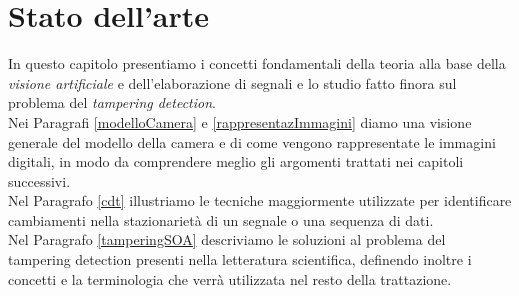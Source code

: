 \chapter{Stato dell'arte}
\label{StatoArte}
\thispagestyle{empty}

\vspace{0.5cm}

\noindent In questo capitolo presentiamo i concetti fondamentali della teoria alla base della \textit{visione artificiale} e dell'elaborazione di segnali e lo studio fatto finora sul problema del \textit{tampering detection}.\\
Nei Paragrafi \ref{modelloCamera} e \ref{rappresentazImmagini} diamo una visione generale del modello della camera e di come vengono rappresentate le immagini digitali, in modo da comprendere meglio gli argomenti trattati nei capitoli successivi.\\
Nel Paragrafo \ref{cdt} illustriamo le tecniche maggiormente utilizzate per identificare cambiamenti nella stazionariet\`a di un segnale o una sequenza di dati.\\
Nel Paragrafo \ref{tamperingSOA} descriviamo le soluzioni al problema del tampering detection presenti nella letteratura scientifica, definendo inoltre i concetti e la terminologia che verr\`a utilizzata nel resto della trattazione.
